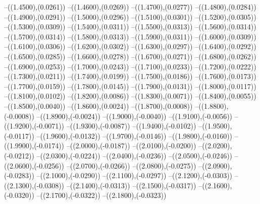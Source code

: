 {	--({\sx*(1.4500)},{\sy*(0.0261)})
	--({\sx*(1.4600)},{\sy*(0.0269)})
	--({\sx*(1.4700)},{\sy*(0.0277)})
	--({\sx*(1.4800)},{\sy*(0.0284)})
	--({\sx*(1.4900)},{\sy*(0.0291)})
	--({\sx*(1.5000)},{\sy*(0.0296)})
	--({\sx*(1.5100)},{\sy*(0.0301)})
	--({\sx*(1.5200)},{\sy*(0.0305)})
	--({\sx*(1.5300)},{\sy*(0.0309)})
	--({\sx*(1.5400)},{\sy*(0.0311)})
	--({\sx*(1.5500)},{\sy*(0.0313)})
	--({\sx*(1.5600)},{\sy*(0.0314)})
	--({\sx*(1.5700)},{\sy*(0.0314)})
	--({\sx*(1.5800)},{\sy*(0.0313)})
	--({\sx*(1.5900)},{\sy*(0.0311)})
	--({\sx*(1.6000)},{\sy*(0.0309)})
	--({\sx*(1.6100)},{\sy*(0.0306)})
	--({\sx*(1.6200)},{\sy*(0.0302)})
	--({\sx*(1.6300)},{\sy*(0.0297)})
	--({\sx*(1.6400)},{\sy*(0.0292)})
	--({\sx*(1.6500)},{\sy*(0.0285)})
	--({\sx*(1.6600)},{\sy*(0.0278)})
	--({\sx*(1.6700)},{\sy*(0.0271)})
	--({\sx*(1.6800)},{\sy*(0.0262)})
	--({\sx*(1.6900)},{\sy*(0.0253)})
	--({\sx*(1.7000)},{\sy*(0.0243)})
	--({\sx*(1.7100)},{\sy*(0.0233)})
	--({\sx*(1.7200)},{\sy*(0.0222)})
	--({\sx*(1.7300)},{\sy*(0.0211)})
	--({\sx*(1.7400)},{\sy*(0.0199)})
	--({\sx*(1.7500)},{\sy*(0.0186)})
	--({\sx*(1.7600)},{\sy*(0.0173)})
	--({\sx*(1.7700)},{\sy*(0.0159)})
	--({\sx*(1.7800)},{\sy*(0.0145)})
	--({\sx*(1.7900)},{\sy*(0.0131)})
	--({\sx*(1.8000)},{\sy*(0.0117)})
	--({\sx*(1.8100)},{\sy*(0.0102)})
	--({\sx*(1.8200)},{\sy*(0.0086)})
	--({\sx*(1.8300)},{\sy*(0.0071)})
	--({\sx*(1.8400)},{\sy*(0.0055)})
	--({\sx*(1.8500)},{\sy*(0.0040)})
	--({\sx*(1.8600)},{\sy*(0.0024)})
	--({\sx*(1.8700)},{\sy*(0.0008)})
	--({\sx*(1.8800)},{\sy*(-0.0008)})
	--({\sx*(1.8900)},{\sy*(-0.0024)})
	--({\sx*(1.9000)},{\sy*(-0.0040)})
	--({\sx*(1.9100)},{\sy*(-0.0056)})
	--({\sx*(1.9200)},{\sy*(-0.0071)})
	--({\sx*(1.9300)},{\sy*(-0.0087)})
	--({\sx*(1.9400)},{\sy*(-0.0102)})
	--({\sx*(1.9500)},{\sy*(-0.0117)})
	--({\sx*(1.9600)},{\sy*(-0.0132)})
	--({\sx*(1.9700)},{\sy*(-0.0146)})
	--({\sx*(1.9800)},{\sy*(-0.0160)})
	--({\sx*(1.9900)},{\sy*(-0.0174)})
	--({\sx*(2.0000)},{\sy*(-0.0187)})
	--({\sx*(2.0100)},{\sy*(-0.0200)})
	--({\sx*(2.0200)},{\sy*(-0.0212)})
	--({\sx*(2.0300)},{\sy*(-0.0224)})
	--({\sx*(2.0400)},{\sy*(-0.0236)})
	--({\sx*(2.0500)},{\sy*(-0.0246)})
	--({\sx*(2.0600)},{\sy*(-0.0256)})
	--({\sx*(2.0700)},{\sy*(-0.0266)})
	--({\sx*(2.0800)},{\sy*(-0.0275)})
	--({\sx*(2.0900)},{\sy*(-0.0283)})
	--({\sx*(2.1000)},{\sy*(-0.0290)})
	--({\sx*(2.1100)},{\sy*(-0.0297)})
	--({\sx*(2.1200)},{\sy*(-0.0303)})
	--({\sx*(2.1300)},{\sy*(-0.0308)})
	--({\sx*(2.1400)},{\sy*(-0.0313)})
	--({\sx*(2.1500)},{\sy*(-0.0317)})
	--({\sx*(2.1600)},{\sy*(-0.0320)})
	--({\sx*(2.1700)},{\sy*(-0.0322)})
	--({\sx*(2.1800)},{\sy*(-0.0323)})
}
